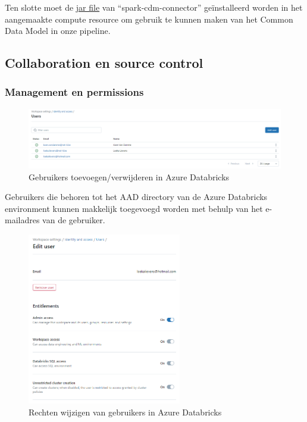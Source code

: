 Ten slotte moet de \href{https://github.com/Azure/spark-cdm-connector/releases/tag/spark3.3-1.19.5}{jar file} van ``spark-cdm-connector'' geïnstalleerd worden in het aangemaakte compute resource om gebruik te kunnen maken van het Common Data Model in onze pipeline.

\subsection{Collaboration en source control}

\subsubsection{Management en permissions}

\begin{figure}[H]
    \centering
    \includegraphics[width=1\textwidth]{./graphics/databricks/management_permissions_1.png}
    \caption{Gebruikers toevoegen/verwijderen in Azure Databricks}
\end{figure}

Gebruikers die behoren tot het AAD directory van de Azure Databricks environment kunnen makkelijk toegevoegd worden met behulp van het e-mailadres van de gebruiker.

\begin{figure}[H]
    \centering
    \includegraphics[width=0.6\textwidth]{./graphics/databricks/management_permissions_2.png}
    \caption{Rechten wijzigen van gebruikers in Azure Databricks}
\end{figure}

